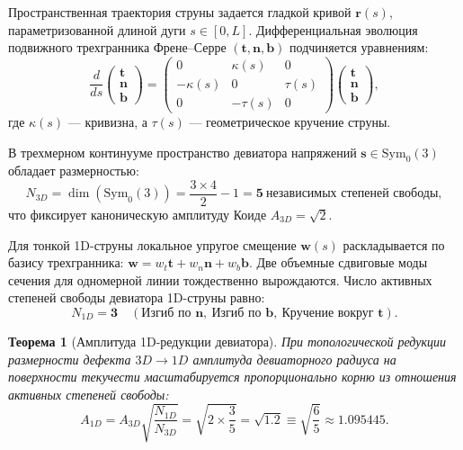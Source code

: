 \documentclass[12pt,a4paper]{article}
\newtheorem{theorem}{Теорема}
\begin{document}
	Пространственная траектория струны задается гладкой кривой $\mathbf{r}(s)$, параметризованной длиной дуги $s \in [0, L]$. Дифференциальная эволюция подвижного трехгранника Френе--Серре $(\mathbf{t}, \mathbf{n}, \mathbf{b})$ подчиняется уравнениям:
	\begin{equation}
		\frac{d}{ds} \begin{pmatrix} \mathbf{t} \\ \mathbf{n} \\ \mathbf{b} \end{pmatrix} = \begin{pmatrix} 0 & \kappa(s) & 0 \\ -\kappa(s) & 0 & \tau(s) \\ 0 & -\tau(s) & 0 \end{pmatrix} \begin{pmatrix} \mathbf{t} \\ \mathbf{n} \\ \mathbf{b} \end{pmatrix},
	\end{equation}
	где $\kappa(s)$ --- кривизна, а $\tau(s)$ --- геометрическое кручение струны.
	
	В трехмерном континууме пространство девиатора напряжений $\mathbf{s} \in \mathrm{Sym}_0(3)$ обладает размерностью:
	\begin{equation}
		N_{3D} = \dim(\mathrm{Sym}_0(3)) = \frac{3 \times 4}{2} - 1 = \mathbf{5} \ \text{независимых степеней свободы},
	\end{equation}
	что фиксирует каноническую амплитуду Коиде $A_{3D} = \sqrt{2}$.
	
	Для тонкой 1D-струны локальное упругое смещение $\mathbf{w}(s)$ раскладывается по базису трехгранника: $\mathbf{w} = w_t \mathbf{t} + w_n \mathbf{n} + w_b \mathbf{b}$. Две объемные сдвиговые моды сечения для одномерной линии тождественно вырождаются. Число активных степеней свободы девиатора 1D-струны равно:
	\begin{equation}
		N_{1D} = \mathbf{3} \quad (\text{Изгиб по } \mathbf{n}, \ \text{Изгиб по } \mathbf{b}, \ \text{Кручение вокруг } \mathbf{t}).
	\end{equation}
	
	\begin{theorem}[Амплитуда 1D-редукции девиатора]
		При топологической редукции размерности дефекта $3D \to 1D$ амплитуда девиаторного радиуса на поверхности текучести масштабируется пропорционально корню из отношения активных степеней свободы:
		\begin{equation}
			A_{1D} = A_{3D} \sqrt{\frac{N_{1D}}{N_{3D}}} = \sqrt{2 \times \frac{3}{5}} = \mathbf{\sqrt{1.2}} \equiv \sqrt{\frac{6}{5}} \approx 1.095445.
		\end{equation}
	\end{theorem}
	
\end{document}
